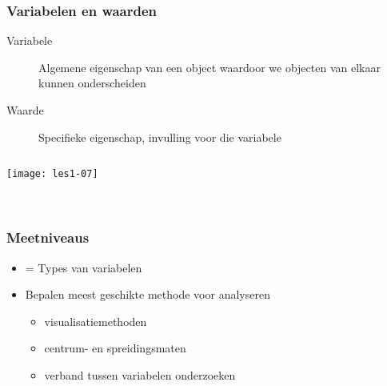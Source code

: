 \documentclass[aspectratio=169]{beamer}
\begin{document}
\begin{frame}
  \frametitle{Variabelen en waarden}
  
  \begin{description}
    \item[Variabele] Algemene eigenschap van een object waardoor we objecten van elkaar kunnen onderscheiden
    \item[Waarde] Specifieke eigenschap, invulling voor die variabele
  \end{description}
  
  \vspace{1cm}
  
  \begin{columns}[c]
    \centering
    \texttt{[image: les1-07]}
    
    \\
    \vspace{.5cm}
    \\
    \vspace{.5cm}
    
  \end{columns}
\end{frame}

\begin{frame}
  \frametitle{Meetniveaus}
  
  \begin{itemize}
    \item = Types van variabelen
    \item Bepalen meest geschikte methode voor analyseren
    \begin{itemize}
      \item visualisatiemethoden
      \item centrum- en spreidingsmaten
      \item verband tussen variabelen onderzoeken
    \end{itemize}
  \end{itemize}
  
\end{frame}
\end{document}
